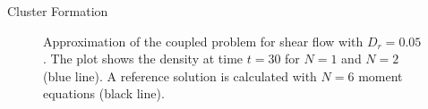 \begin{frame}{Cluster Formation}
\begin{figure}
\begin{minipage}{0.46\textwidth}
		\end{minipage}
		\caption{Approximation of the coupled problem for shear flow with $D_r =0.05$. The plot shows the density at time $t=30$ for $N = 1$ and $N = 2$ (blue line). A reference solution is calculated with $N = 6$ moment equations (black line).}
		\label{ClusterFormation}
	\end{figure}
\end{frame}

